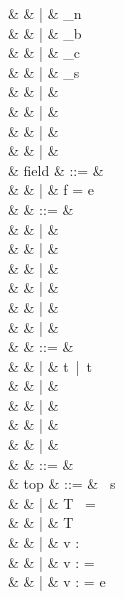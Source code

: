 \documentclass[a4paper]{article}
\begin{document}
{\begin{grammar}
                    &   & |   & \ell_n \\
                    &   & |   & \ell_b \\
                    &   & |   & \ell_c \\
                    &   & |   & \ell_s \\
                    &   & |   &  \\
                    &   & |   &  \\
                    &   & |   &  \\
                    &   & |   &  \\
   & field & ::= & \sALLFIELDS \\
               &       & |   & f = e \\
   & \tau & ::= & \stynf{\tau} \\
              &      & |   & \sUNBOX \tau \\
              &      & |   & \tau \sBANG \\
              &      & |   &  \\
              &      & |   & \stytake{\tau}{\sALLFIELDS} \\
              &      & |   &  \\
              &      & |   & \styput{\tau}{\sALLFIELDS} \\
   & \stynf{\tau} & ::= &  \\
                   &              & |   & t\sBANG\ |\ t \\
                   &              & |   & \styfun{\tau}{\tau} \\
                   &              & |   &  \\
                   &              & |   &  \\
                   &              & |   &  \\
   & \sigma & ::= & \ \tau \\
   & top & ::= & \sINCLUDE\ s \\
                   &     & |   & T\  = \tau \\
                   &     & |   & T\  \\
                   &     & |   & v : \sigma \\
                   &     & |   & v : \sigma =  \\
                   &     & |   & v : \tau = e
\end{grammar}
}
\end{document}
